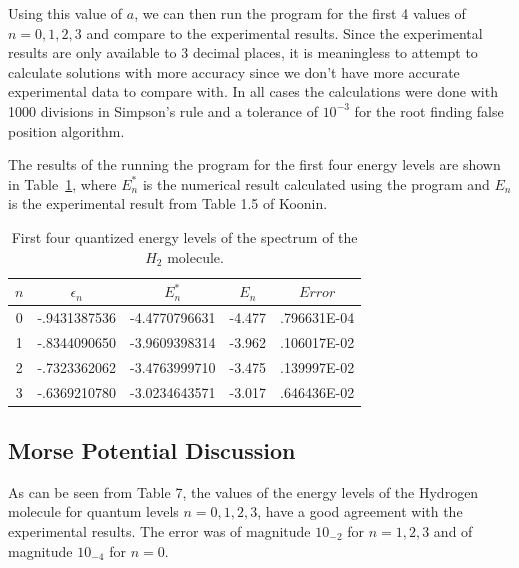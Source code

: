 \documentclass[a4paper]{IEEEtran}
\begin{document}
      Using this value of $a$, we can then run the program for the first
      4 values of $n = 0,1,2,3$ and compare to the experimental results.
      Since the experimental results are only available to 3 decimal
      places, it is meaningless to attempt to calculate solutions with
      more accuracy since we don't have more accurate experimental data
      to compare with. In all cases the calculations were done with 1000
      divisions in Simpson's rule and a tolerance of $10^{-3}$ for the
      root finding false position algorithm.

      The results of the running the program for the first four energy
      levels are shown in Table~\ref{tbl:first-four}, where $E_n^{*}$ is the
      numerical result calculated using the program and $E_n$ is the 
      experimental result from Table 1.5 of Koonin.

      \begin{table}[h]
      \caption{First four quantized energy levels of
      the spectrum of the $H_2$ molecule.}
      \label{tbl:first-four} 
      \begin{center}
      \begin{tabular}{|c|c|c|c|c|} \hline
      $n$   &   $\epsilon_n$  & $E_n^{*}$       &  $E_n$    & $Error$   \\\hline \hline
      0     &   -.9431387536  & -4.4770796631   & -4.477    & .796631E-04 \\
      1     &   -.8344090650  & -3.9609398314   & -3.962    & .106017E-02 \\ 
      2     &   -.7323362062  & -3.4763999710   & -3.475    & .139997E-02 \\
      3     &   -.6369210780  & -3.0234643571   & -3.017    & .646436E-02 \\ \hline
      \end{tabular}
      \end{center}
      \end{table} 

\subsection{Morse Potential Discussion}

      As can be seen from Table 7, the values of the energy levels of
      the Hydrogen molecule for quantum levels $n = 0,1,2,3$, have a
      good agreement with the experimental results. The error was of
      magnitude $10_{-2}$ for $n = 1,2,3$ and of magnitude $10_{-4}$ for
      $n = 0$. 
\end{document}
